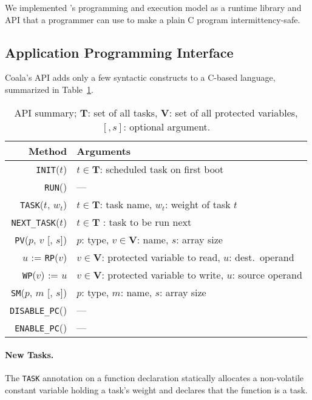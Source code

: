 We implemented \sys's programming and execution model as a runtime library and API that a programmer can use to make a plain C program intermittency-safe.
%
\subsection{Application Programming Interface}
\label{sec:coala_api}
%
Coala's API adds only a few syntactic constructs to a C-based language, summarized
in Table~\ref{table:coala_api}.
%
\begin{table}
\footnotesize
\centering
\begin{tabular}{| r | p{} |}
	\hline
	{Method} & {Arguments} \\
	\hline\hline
	\texttt{INIT}($t$) & $t \in \mathbf{T}$: scheduled task on first boot \\
	\hline
	\texttt{RUN}() & --- \\
	\hline
	\texttt{TASK}($t$, $w_t$) & $t \in \mathbf{T}$: task name, $w_t$: weight of task $t$ \\
	\hline
	\texttt{NEXT\_TASK}($t$) & $t \in \mathbf{T}$ : task to be run next \\
	\hline
	\texttt{PV}($p$, $v$ [, $s$]) & $p$: type, $v \in \mathbf{V}$: name, $s$: array size \\
	\hline
	$u$ := \texttt{RP}($v$) & $v \in \mathbf{V}$: protected variable to read, $u$: dest.\ operand \\
	\hline	
	\texttt{WP}($v$) := $u$ &  $v \in \mathbf{V}$: protected variable to write, $u$: source operand \\
	\hline
	\texttt{SM}($p$, $m$ [, $s$]) & $p$: type, $m$: name, $s$: array size \\
	\hline
	\texttt{DISABLE\_PC}() & --- \\
	\hline
	\texttt{ENABLE\_PC}() & --- \\
	\hline
\end{tabular}
\caption{API summary; $\mathbf{T}$: set of all tasks, $\mathbf{V}$: set of all protected variables, $[, s]$: optional argument.}
\label{table:coala_api}
\end{table}

\paragraph{New Tasks.} The \texttt{TASK} annotation on a function
declaration statically allocates a non-volatile constant variable holding a
task's weight and declares that the function is a task.

